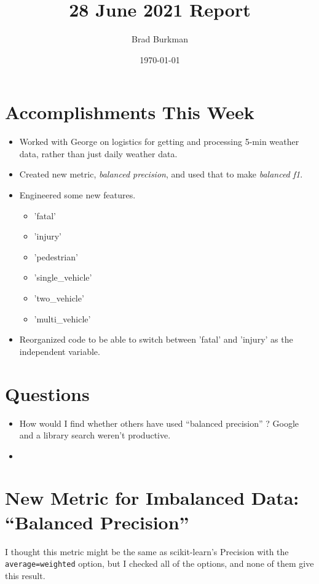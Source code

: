 \documentclass[11pt]{article}
\title{28 June 2021 Report}
\author{Brad Burkman}
\date{\today}
\begin{document}
\setlength{\parindent}{20pt}
\begin{spacing}{1.2}
\maketitle
\tableofcontents


\section{Accomplishments This Week}

\begin{itemize}
	\item Worked with George on logistics for getting and processing 5-min weather data, rather than just daily weather data.
	\item Created new metric, {\it balanced precision}, and used that to make {\it balanced f1}.
	\item Engineered some new features.
	\begin{itemize}
		\item 'fatal'
		\item 'injury'
		\item 'pedestrian'
		\item 'single\_vehicle'
		\item 'two\_vehicle'
		\item 'multi\_vehicle'
	\end{itemize}
	\item Reorganized code to be able to switch between 'fatal' and 'injury' as the independent variable. 
\end{itemize}

\section{Questions}

\begin{itemize}
	\item How would I find whether others have used ``balanced precision'' ?  Google and a library search weren't productive.  
	\item 
\end{itemize}

\section{New Metric for Imbalanced Data:  ``Balanced Precision''}

I thought this metric might be the same as scikit-learn's Precision with the \verb|average=weighted| option, but I checked all of the options, and none of them give this result.  


\end{spacing}
\end{document}
